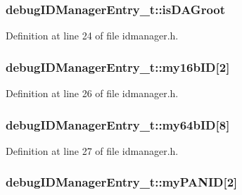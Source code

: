 \subsubsection[{\texorpdfstring{is\+D\+A\+Groot}{isDAGroot}}]{ debug\+I\+D\+Manager\+Entry\+\_\+t\+::is\+D\+A\+Groot}\hypertarget{structdebug_i_d_manager_entry__t_a406a9dbcadf394e7c5c87d929844142d}{}\label{structdebug_i_d_manager_entry__t_a406a9dbcadf394e7c5c87d929844142d}


Definition at line 24 of file idmanager.\+h.

\subsubsection[{\texorpdfstring{my16b\+ID}{my16bID}}]{ debug\+I\+D\+Manager\+Entry\+\_\+t\+::my16b\+ID\mbox{[}2\mbox{]}}\hypertarget{structdebug_i_d_manager_entry__t_aa3beb13af72cc70268576eeb8ef8f5a6}{}\label{structdebug_i_d_manager_entry__t_aa3beb13af72cc70268576eeb8ef8f5a6}


Definition at line 26 of file idmanager.\+h.

\subsubsection[{\texorpdfstring{my64b\+ID}{my64bID}}]{ debug\+I\+D\+Manager\+Entry\+\_\+t\+::my64b\+ID\mbox{[}8\mbox{]}}\hypertarget{structdebug_i_d_manager_entry__t_a91a9cf63e3854e805a3d6d8382362968}{}\label{structdebug_i_d_manager_entry__t_a91a9cf63e3854e805a3d6d8382362968}


Definition at line 27 of file idmanager.\+h.

\subsubsection[{\texorpdfstring{my\+P\+A\+N\+ID}{myPANID}}]{ debug\+I\+D\+Manager\+Entry\+\_\+t\+::my\+P\+A\+N\+ID\mbox{[}2\mbox{]}}\hypertarget{structdebug_i_d_manager_entry__t_a7b54cf7f9eae10784e09642b4b1f4551}{}\label{structdebug_i_d_manager_entry__t_a7b54cf7f9eae10784e09642b4b1f4551}


